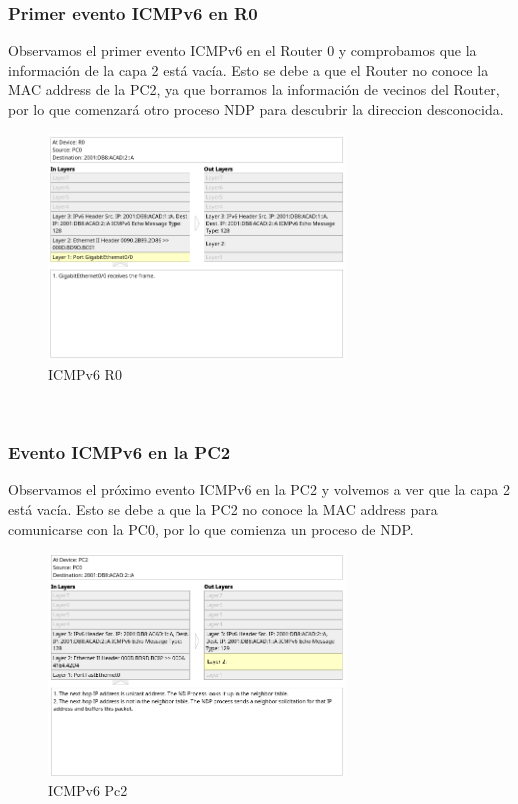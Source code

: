 \documentclass[a4paper,12pt]{article}
\begin{document}
\subsubsection{Primer evento ICMPv6 en R0}
Observamos el primer evento ICMPv6 en el  Router 0 y comprobamos que la información de la capa 2 está vacía. Esto se debe a que el Router no conoce la MAC address de la PC2, ya que borramos la información de vecinos del Router, por lo que comenzará otro proceso NDP para descubrir la direccion desconocida. \\
\begin{figure}[h]
    \centering
    \includegraphics[width=0.7\textwidth]{imagenes/4.png}
    \caption{ICMPv6 R0}
\end{figure}\\

\FloatBarrier

\subsubsection{Evento ICMPv6 en la PC2}
Observamos el próximo evento ICMPv6 en la PC2 y volvemos a ver que la capa 2 está vacía. Esto se debe a que la PC2 no conoce la MAC address para comunicarse con la PC0, por lo que comienza un proceso de NDP.\\
\begin{figure}[h]
    \centering
    \includegraphics[width=0.7\textwidth]{imagenes/5.png}
    \caption{ICMPv6 Pc2}
\end{figure}\\
\end{document}
